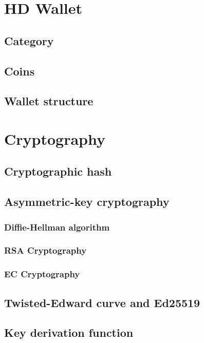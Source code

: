 \section{HD Wallet}
\label{sec:hd_wallet}



\subsection{Category}

\subsection{Coins}

\subsection{Wallet structure}

\section{Cryptography}

\subsection{Cryptographic hash}
\label{sec:crypto_hash}

\subsection{Asymmetric-key cryptography}
\label{sec:asymmetric_cryptography}

\subsubsection{Diffie-Hellman algorithm}

\subsubsection{RSA Cryptography}

\subsubsection{EC Cryptography}

\subsection{Twisted-Edward curve and Ed25519}

\subsection{Key derivation function}
